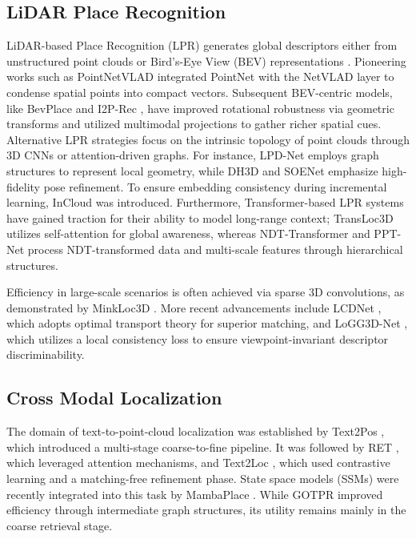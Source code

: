 \documentclass{article}
\begin{document}
\subsection{LiDAR Place Recognition}
LiDAR-based Place Recognition (LPR) generates global descriptors either from unstructured point clouds or Bird’s-Eye View (BEV) representations \cite{lin2024rsbev}. Pioneering works such as PointNetVLAD \cite{uy2018pointnetvlad} integrated PointNet \cite{qi2017pointnet} with the NetVLAD layer to condense spatial points into compact vectors. Subsequent BEV-centric models, like BevPlace \cite{luo2023bevplace} and I2P-Rec \cite{zheng2023i2p}, have improved rotational robustness via geometric transforms and utilized multimodal projections to gather richer spatial cues.\\
\indent Alternative LPR strategies focus on the intrinsic topology of point clouds through 3D CNNs or attention-driven graphs. For instance, LPD-Net \cite{liu2019lpd} employs graph structures to represent local geometry, while DH3D \cite{du2020dh3d} and SOENet \cite{xia2021soe} emphasize high-fidelity pose refinement. To ensure embedding consistency during incremental learning, InCloud \cite{knights2022incloud} was introduced. Furthermore, Transformer-based LPR systems have gained traction for their ability to model long-range context; TransLoc3D \cite{xu2021transloc3d} utilizes self-attention for global awareness, whereas NDT-Transformer \cite{zhou2021ndt} and PPT-Net \cite{hui2021pyramid} process NDT-transformed data and multi-scale features through hierarchical structures. 

Efficiency in large-scale scenarios is often achieved via sparse 3D convolutions, as demonstrated by MinkLoc3D \cite{komorowski2021minkloc3d}. More recent advancements include LCDNet \cite{cattaneo2022lcdnet}, which adopts optimal transport theory for superior matching, and LoGG3D-Net \cite{vidanapathirana2022logg3d}, which utilizes a local consistency loss to ensure viewpoint-invariant descriptor discriminability.
\subsection{Cross Modal Localization}
The domain of text-to-point-cloud localization was established by Text2Pos \cite{kolmet2022text2pos}, which introduced a multi-stage coarse-to-fine pipeline. It was followed by RET \cite{wang2023text}, which leveraged attention mechanisms, and Text2Loc \cite{xia2024text2loc}, which used contrastive learning and a matching-free refinement phase. State space models (SSMs) were recently integrated into this task by MambaPlace \cite{shang2024mambaplace}. While GOTPR \cite{jung2025gotpr} improved efficiency through intermediate graph structures, its utility remains mainly in the coarse retrieval stage. 
\end{document}
